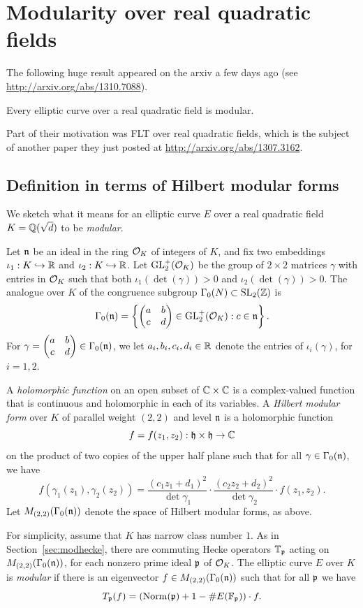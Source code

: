 \documentclass{book}
\begin{document}
\section{Modularity over real quadratic fields}

The following huge result appeared on the arxiv a few days ago (see
\url{http://arxiv.org/abs/1310.7088}).
\begin{theorem}
Every elliptic curve over a real quadratic field is modular.
\end{theorem}
Part of their motivation was FLT over real quadratic fields, which
is the subject of another paper they just posted at \url{http://arxiv.org/abs/1307.3162}.


\subsection{Definition in terms of Hilbert modular forms}

We sketch what it means for an elliptic curve $E$
over a real quadratic field $K=\mathbb{Q}(\sqrt{d})$ to be
{\em modular}.

Let $\mathfrak{n}$ be an ideal in the ring $\mathcal{O}_K$ of integers of $K$,
and fix two embeddings $\iota_1:K\hookrightarrow \mathbb{R}$
and $\iota_2:K\hookrightarrow\mathbb{R}$.
Let $\operatorname{GL}_2^+(\mathcal{O}_K)$ be the group of $2\times 2$ matrices
$\gamma$ with entries in $\mathcal{O}_K$ such that
both $\iota_1(\det(\gamma))>0$ and
$\iota_2(\det(\gamma))>0$.
The analogue over $K$ of the congruence subgroup $\Gamma_0(N)\subset\operatorname{SL}_2(\mathbb{Z})$ is
$$
\Gamma_0(\mathfrak{n})
 = \left\{
\left( \begin{matrix}a&b\\c&d \end{matrix}\right) \in \operatorname{GL}_2^+(\mathcal{O}_K)  :
  c \in \mathfrak{n}
   \right\}.
$$
For $\gamma=\left( \begin{matrix}a&b\\c&d \end{matrix}\right)\in \Gamma_0(\mathfrak{n})$,
we let $a_i,b_i,c_i,d_i\in\mathbb{R}$ denote the entries
of $\iota_i(\gamma)$, for $i=1,2$.

A {\em holomorphic function} on
an open subset of $\mathbb{C}\times \mathbb{C}$ is a complex-valued function
that is continuous and holomorphic in each of its variables.
A {\em Hilbert modular form} over $K$ of parallel weight $(2,2)$
and level $\mathfrak{n}$
is a holomorphic function
$$
f = f(z_1,z_2):\mathfrak{h}\times \mathfrak{h} \to \mathbb{C}
$$
on the product of two copies of the upper half plane such that
for all $\gamma \in \Gamma_0(\mathfrak{n})$, we have
$$
  f(\gamma_1(z_1), \gamma_2(z_2))
     = \frac{(c_1 z_1 + d_1)^2}{\det \gamma_1}
       \cdot  \frac{(c_2 z_2 + d_2)^2}{\det \gamma_2}
       \cdot f(z_1, z_2).
$$
Let $M_{(2,2)}(\Gamma_0(\mathfrak{n}))$ denote the space of Hilbert modular forms,
as above.

For simplicity, assume that $K$ has narrow class number $1$.
As in Section~\ref{sec:modhecke}, there are commuting Hecke operators
$\mathbb{T}_{\mathfrak{p}}$ acting on $M_{(2,2)}(\Gamma_0(\mathfrak{n}))$,
for each nonzero prime ideal $\mathfrak{p}$ of $\mathcal{O}_K$.
The elliptic curve $E$ over $K$ is {\em modular} if there
is an eigenvector $f \in M_{(2,2)}(\Gamma_0(\mathfrak{n}))$ such that
for all $\mathfrak{p}$ we have
$$
  T_{\mathfrak{p}}(f) = (\text{Norm}(\mathfrak{p}) + 1 - \#E(\mathbb{F}_{\mathfrak{p}})) \cdot f.
$$
\end{document}
